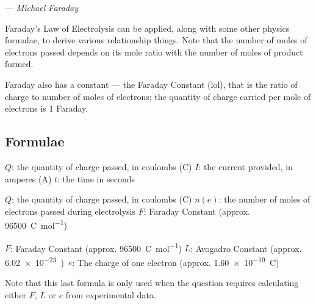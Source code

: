			--- \textit{Michael Faraday}

			Faraday's Law of Electrolysis can be applied, along with some other physics formulae, to derive various relationship things. Note
			that the number of moles of electrons passed depends on its mole ratio with the number of moles of product formed.

			Faraday also has a constant --- the Faraday Constant (lol), that is the ratio of charge to number of moles of electrons; the
			quantity of charge carried per mole of electrons is 1 Faraday.



		\subsection{Formulae}


			\tabto{0mm}$Q$: \tabto{10mm}the quantity of charge passed, in coulombs (\si{\coulomb})
			\tabto{0mm}$I$: \tabto{10mm}the current provided, in amperes (\si{\ampere})
			\tabto{0mm}$t$:	\tabto{10mm}the time in seconds

			\vspace{1em}



			\tabto{0mm}$Q$:		\tabto{10mm}the quantity of charge passed, in coulombs (\si{\coulomb})
			\tabto{0mm}$n(e)$:	\tabto{10mm}the number of moles of electrons passed during electrolysis
			\tabto{0mm}$F$:		\tabto{10mm}Faraday Constant (approx. \SI{96500}{\coulomb\per\mole})

			\vspace{1em}



			\tabto{0mm}$F$:		\tabto{10mm}Faraday Constant (approx. \SI{96500}{\coulomb\per\mole})
			\tabto{0mm}$L$:		\tabto{10mm}Avogadro Constant (approx. \SI{6.02e-23})
			\tabto{0mm}$e$:		\tabto{10mm}The charge of one electron (approx. \SI{1.60e-19}{\coulomb})


			Note that this last formula is only used when the question requires calculating either $F$, $L$ or $e$ from experimental data.


